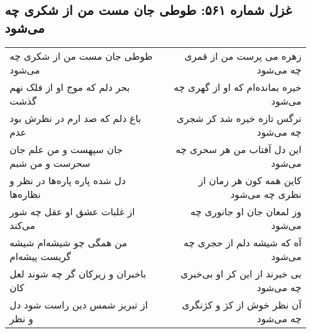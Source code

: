 \begin{center}
\section*{غزل شماره ۵۶۱: طوطی جان مست من از شکری چه می‌شود}
\label{sec:0561}
\begin{longtable}{l p{0.5cm} r}
طوطی جان مست من از شکری چه می‌شود
&&
زهره می پرست من از قمری چه می‌شود
\\
بحر دلم که موج او از فلک نهم گذشت
&&
خیره بمانده‌ام که او از گهری چه می‌شود
\\
باغ دلم که صد ارم در نظرش بود عدم
&&
نرگس تازه خیره شد کز شجری چه می‌شود
\\
جان سپهست و من علم جان سحرست و من شبم
&&
این دل آفتاب من هر سحری چه می‌شود
\\
دل شده پاره پاره‌ها در نظر و نظاره‌ها
&&
کاین همه کون هر زمان از نظری چه می‌شود
\\
از غلبات عشق او عقل چه شور می‌کند
&&
وز لمعان جان او جانوری چه می‌شود
\\
من همگی چو شیشه‌ام شیشه گریست پیشه‌ام
&&
آه که شیشه دلم از حجری چه می‌شود
\\
باخبران و زیرکان گر چه شوند لعل کان
&&
بی خبرند از این کز او بی‌خبری چه می‌شود
\\
از تبریز شمس دین راست شود دل و نظر
&&
آن نظر خوش از کژ و کژنگری چه می‌شود
\\
\end{longtable}
\end{center}
